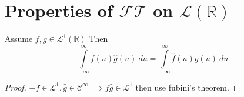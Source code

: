 \section{Properties of $ \mathscr{ FT }  $ on $ \mathscr{ L } ( \mathbb{R}) $ }
\label{sec:Properties of $ \mathscr{ FT }  $ on $ \mathscr{ L } ( \mathbb{R}) $ }
\begin{ftheo}
    Assume $ f, g\in \mathscr{L}^1( \mathbb{R})    $
    Then 
    \[
        \int\limits_{-\infty}^{\infty} f(u) \widehat{g}(u) \ du =
        \int\limits_{-\infty}^{\infty} \widehat{f}(u)g(u) \ du 
    \]
    \label{theo:Exchange Property}
\end{ftheo}

\begin{proof}
    $ -f \in \mathscr{L}^1, \widehat{g} \in \mathscr{ C } ^{\infty} \implies f\widehat{g}
    \in \mathscr{L}^1 $ then use fubini's theorem. 
\end{proof}


